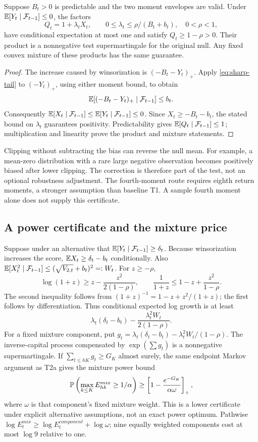 \begin{theorem}
Suppose $B_t>0$ is predictable and the two moment envelopes are valid. Under
$\mathbb E[Y_t\mid\mathcal F_{t-1}]\le0$, the factors
\[
 Q_t=1+\lambda_t X_t,\qquad
 0\le\lambda_t\le\rho/(B_t+b_t),\quad 0<\rho<1,
\]
have conditional expectation at most one and satisfy $Q_t\ge1-\rho>0$.
Their product is a nonnegative test supermartingale for the original null.
Any fixed convex mixture of these products has the same guarantee.
\end{theorem}
\begin{proof}
The increase caused by winsorization is $(-B_t-Y_t)_+$. Apply
\eqref{eq:sharp-tail} to $(-Y_t)_+$, using either moment bound, to obtain
\[
 \mathbb E[(-B_t-Y_t)_+\mid\mathcal F_{t-1}]\le b_t.
\]
Consequently $\mathbb E[X_t\mid\mathcal F_{t-1}]\le\mathbb E[Y_t\mid\mathcal F_{t-1}]\le0$.
Since $X_t\ge-B_t-b_t$, the stated bound on $\lambda_t$ guarantees
positivity. Predictability gives $\mathbb E[Q_t\mid\mathcal F_{t-1}]\le1$; multiplication
and linearity prove the product and mixture statements.
\end{proof}

Clipping without subtracting the bias can reverse the null mean. For
example, a mean-zero distribution with a rare large negative observation
becomes positively biased after lower clipping. The correction is therefore
part of the test, not an optional robustness adjustment. The fourth-moment
route requires eighth return moments, a stronger assumption than baseline
T1. A sample fourth moment alone does not supply this certificate.

\subsection{A power certificate and the mixture price}
Suppose under an alternative that $\mathbb E[Y_t\mid\mathcal F_{t-1}]\ge\delta_t$.
Because winsorization increases the score,
$\mathbb E X_t\ge\delta_t-b_t$ conditionally. Also
$\mathbb E[X_t^2\mid\mathcal F_{t-1}]\le(\sqrt{V_{2,t}}+b_t)^2=:W_t$.
For $z\ge-\rho$,
\[
 \log(1+z)\ge z-\frac{z^2}{2(1-\rho)},\qquad
 \frac1{1+z}\le1-z+\frac{z^2}{1-\rho}.
\]
The second inequality follows from
$(1+z)^{-1}=1-z+z^2/(1+z)$; the first follows by differentiation.
Thus conditional expected log growth is at least
\[
 \lambda_t(\delta_t-b_t)-\frac{\lambda_t^2W_t}{2(1-\rho)}.
\]
For a fixed mixture component, put
$g_t=\lambda_t(\delta_t-b_t)-\lambda_t^2W_t/(1-\rho)$.
The inverse-capital process compensated by $\exp(\sum g_t)$ is a
nonnegative supermartingale. If $\sum_{t\le hK}g_t\ge G_K$ almost surely,
the same endpoint Markov argument as T2a gives the mixture power bound
\begin{equation}
 \mathbb P\left(\max_{k\le K}E^{mix}_{hk}\ge1/\alpha\right)
 \ge\left[1-\frac{e^{-G_K}}{\alpha\omega}\right]_+,
\end{equation}
where $\omega$ is that component's fixed mixture weight. This is a lower
certificate under explicit alternative assumptions, not an exact power
optimum. Pathwise $\log E^{mix}_t\ge\log E^{component}_t+\log\omega$;
nine equally weighted components cost at most $\log9$ relative to one.


